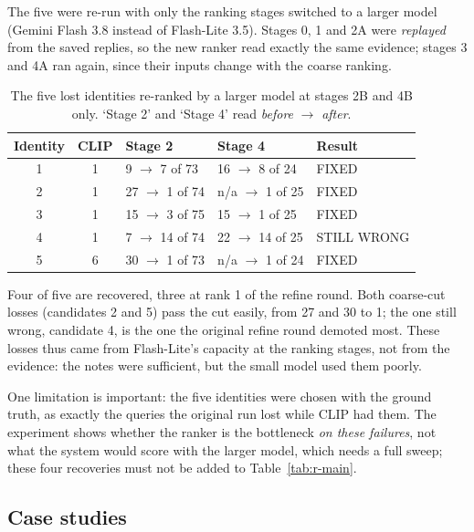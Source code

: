 The five were re-run with only the ranking stages switched to a larger model
(Gemini Flash 3.8 instead of Flash-Lite 3.5). Stages 0, 1 and 2A were
\emph{replayed} from the saved replies, so the new ranker read exactly the same
evidence; stages 3 and 4A ran again, since their inputs change with the coarse
ranking.

\begin{table}[H]
\centering
\small
\begin{tabular}{@{}cclll@{}}
\toprule
\textbf{Identity} & \textbf{CLIP} & \textbf{Stage 2} & \textbf{Stage 4} &
\textbf{Result}\\
\midrule
1 & 1 & 9 $\rightarrow$ 7 of 73  & 16 $\rightarrow$ 8 of 24 & FIXED\\
2 & 1 & 27 $\rightarrow$ 1 of 74 & n/a $\rightarrow$ 1 of 25 & FIXED\\
3 & 1 & 15 $\rightarrow$ 3 of 75 & 15 $\rightarrow$ 1 of 25 & FIXED\\
4 & 1 & 7 $\rightarrow$ 14 of 74 & 22 $\rightarrow$ 14 of 25 & STILL WRONG\\
5 & 6 & 30 $\rightarrow$ 1 of 73 & n/a $\rightarrow$ 1 of 24 & FIXED\\
\bottomrule
\end{tabular}
\caption[The five lost identities re-ranked by a larger model]{The five lost identities re-ranked by a larger model at stages 2B and 4B
only. `Stage 2' and `Stage 4' read \emph{before} $\rightarrow$ \emph{after}.}
\label{tab:r-rerun}
\end{table}

Four of five are recovered, three at rank 1 of the refine round. Both coarse-cut
losses (candidates 2 and 5) pass the cut easily, from 27 and 30 to 1; the one still
wrong, candidate 4, is the one the original refine round demoted most. These losses
thus came from Flash-Lite's capacity at the ranking stages, not from the evidence:
the notes were sufficient, but the small model used them poorly.

One limitation is important: the five identities were chosen with the ground
truth, as exactly the queries the original run lost while CLIP had them. The
experiment shows whether the ranker is the bottleneck \emph{on these failures}, not
what the system would score with the larger model, which needs a full sweep; these
four recoveries must not be added to Table~\ref{tab:r-main}.

\subsection{Case studies}

